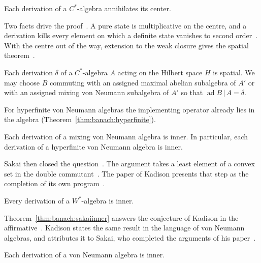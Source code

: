 \begin{theorem}\label{thm:banach:center}
Each derivation of a $C^*$-algebra annihilates its center.
\end{theorem}

Two facts drive the proof~\cite[p.~281]{Kadison1966}. A pure state is
multiplicative on the centre, and a derivation kills every element on which a
definite state vanishes to second order~\cite[p.~281]{Kadison1966}. With the
centre out of the way, extension to the weak closure gives the spatial
theorem~\cite[p.~281]{Kadison1966}.

\begin{theorem}\label{thm:banach:spatial}
Each derivation $\delta$ of a $C^*$-algebra $A$ acting on the Hilbert space
$H$ is spatial. We may choose $B$ commuting with an assigned maximal
abelian subalgebra of $A'$ or with an assigned mixing von Neumann
subalgebra of $A'$ so that $\operatorname{ad} B\,\vert\,A=\delta$.
\end{theorem}

For hyperfinite von Neumann algebras the implementing operator already lies
in the algebra (Theorem~\ref{thm:banach:hyperfinite}).

\begin{theorem}\label{thm:banach:hyperfinite}
Each derivation of a mixing von Neumann algebra is inner. In particular,
each derivation of a hyperfinite von Neumann algebra is inner.
\end{theorem}

Sakai then closed the question~\cite[p.~274]{Sakai1966}. The argument takes a
least element of a convex set in the double
commutant~\cite[p.~290]{Kadison1966}. The paper of Kadison presents that step
as the completion of its own program~\cite[p.~290]{Kadison1966}.

\begin{theorem}\label{thm:banach:sakaiinner}
Every derivation of a $W^*$-algebra is inner.
\end{theorem}

Theorem~\ref{thm:banach:sakaiinner} answers the conjecture of Kadison in the
affirmative~\cite[p.~274]{Sakai1966}. Kadison states the same result in the
language of von Neumann algebras, and attributes it to Sakai, who completed
the arguments of his paper~\cite[Theorem~15, p.~290]{Kadison1966}.

\begin{theorem}\label{thm:banach:kadison-inner}
Each derivation of a von Neumann algebra is inner.
\end{theorem}

